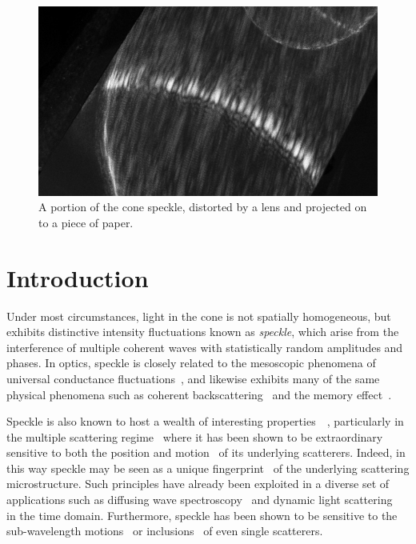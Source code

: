 \begin{figure}[ht]
\centering
\includegraphics[keepaspectratio,width=15cm]{speckle/figures/Ag_LaSFN9_cone_lens11_cam-8899.jpg}
\caption{A portion of the cone speckle, distorted by a lens and projected on to a piece of paper.}
\label{fig:examplespeckle}
\end{figure}
\section{Introduction}

Under most circumstances, light in the cone is not spatially homogeneous, but
exhibits distinctive intensity fluctuations known as \textit{speckle}, which
arise from the interference of multiple coherent waves with statistically
random amplitudes and phases.  In optics, speckle is closely related to the
mesoscopic phenomena of universal conductance
fluctuations~\cite{lee1985universal}, and likewise exhibits many of the same
physical phenomena such as coherent
backscattering~\cite{akkermans1986coherent} and the memory
effect~\cite{freund1988memory}.

Speckle is also known to host a wealth of interesting
properties~\cite{goodman1975statistical}~\cite{freund19981001}, particularly
in the multiple scattering regime~\cite{feng1986sensitivity} where it has been
shown to be extraordinary sensitive to both the position and
motion~\cite{berkovits1994correlations} of its underlying scatterers.  Indeed,
in this way speckle may be seen as a unique
fingerprint~\cite{ravikanth2001physical} of the underlying scattering
microstructure.  Such principles have already been exploited in a diverse set
of applications such as diffusing wave spectroscopy~\cite{pine1988diffusing}
and dynamic light scattering~\cite{berne2000dynamic} in the time domain.
Furthermore, speckle has been shown to be sensitive to the sub-wavelength
motions~\cite{berkovits1991sensitivity} or
inclusions~\cite{berkovits1990theory} of even single scatterers.

